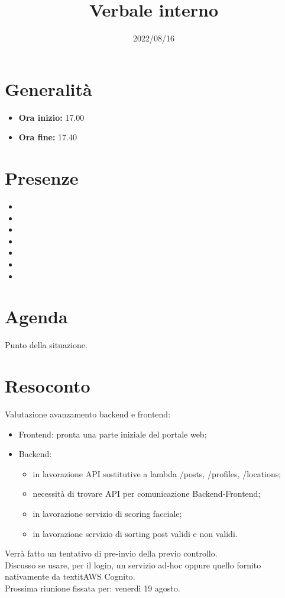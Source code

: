 \documentclass{classes/base}
\title{Verbale interno}
\date{2022/08/16}
\author{\marcob}
\renewcommand{\maketitle}{
    
}
\begin{document}
    \maketitle

    \section*{Generalità}
    \begin{itemize}
        \item \textbf{Ora inizio:} 17.00
        \item \textbf{Ora fine:} 17.40
    \end{itemize}

    \section*{Presenze}
    \begin{itemize}
    	\item \angela
        \item \marcob
        \item \matteo
        \item \marcov
        \item \giulio
        \item \ruth
        \item \tommaso
    \end{itemize}

    \section*{Agenda}
    Punto della situazione.

    \section*{Resoconto}
    Valutazione avanzamento backend e frontend:
    \begin{itemize}
        \item Frontend: pronta una parte iniziale del portale web;
        \item Backend: \begin{itemize}
            \item in lavorazione API sostitutive a lambda /posts, /profiles, /locations;
            \item necessità di trovare API per comunicazione Backend-Frontend;
            \item in lavorazione servizio di scoring facciale;
            \item in lavorazione servizio di sorting post validi e non validi. 
        \end{itemize}
    \end{itemize}
    Verrà fatto un tentativo di pre-invio della \AdR{} previo controllo.\\
    Discusso se usare, per il login, un servizio ad-hoc oppure quello fornito nativamente da textit{AWS Cognito}.\\
    Prossima riunione fissata per: venerdì 19 agosto.
\end{document}
